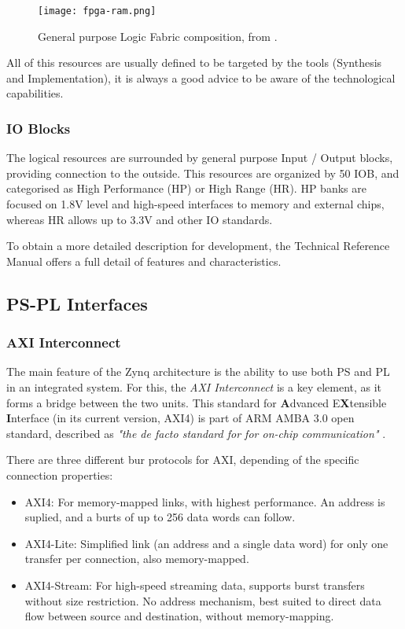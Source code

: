 \begin{figure}[htp]
	\centering
	\texttt{[image: fpga-ram.png]}
	\caption{General purpose Logic Fabric composition, from \cite{Crokett2014}.}
	\label{fig:fpga-ram}
\end{figure}

All of this resources are usually defined to be targeted by the tools (Synthesis and
Implementation), it is always a good advice to be aware of the technological capabilities.

\subsubsection{IO Blocks}

The logical resources are surrounded by general purpose Input / Output blocks, providing connection
to the outside. This resources are organized by 50 IOB, and categorised as High Performance (HP) or
High Range (HR). HP banks are focused on 1.8V level and high-speed interfaces to memory and external
chips, whereas HR allows up to 3.3V and other IO standards.

To obtain a more detailed description for development, the Technical Reference Manual
\cite[p.~38]{UG585} offers a full detail of features and characteristics.

\subsection{PS-PL Interfaces}

\subsubsection*{AXI Interconnect}

The main feature of the Zynq architecture is the ability to use both PS and PL in an integrated
system. For this, the \textit{AXI Interconnect} is a key element, as it forms a bridge between the
two units. This standard for \textbf{A}dvanced E\textbf{X}tensible \textbf{I}nterface (in its
current version, AXI4) is part of ARM AMBA 3.0 open standard, described as \textit{"the de facto
standard for for on-chip communication"} \cite{Crokett2014}.

There are three different bur protocols for AXI, depending of the specific connection properties:

\begin{itemize}
	\item AXI4: For memory-mapped links, with highest performance. An address is suplied, and a
	burts of up to 256 data words can follow.
	\item AXI4-Lite: Simplified link (an address and a single data word) for only one transfer per
	connection, also memory-mapped.
	\item AXI4-Stream: For high-speed streaming data, supports burst transfers without size
	restriction. No address mechanism, best suited to direct data flow between source and
	destination, without memory-mapping.
\end{itemize}

